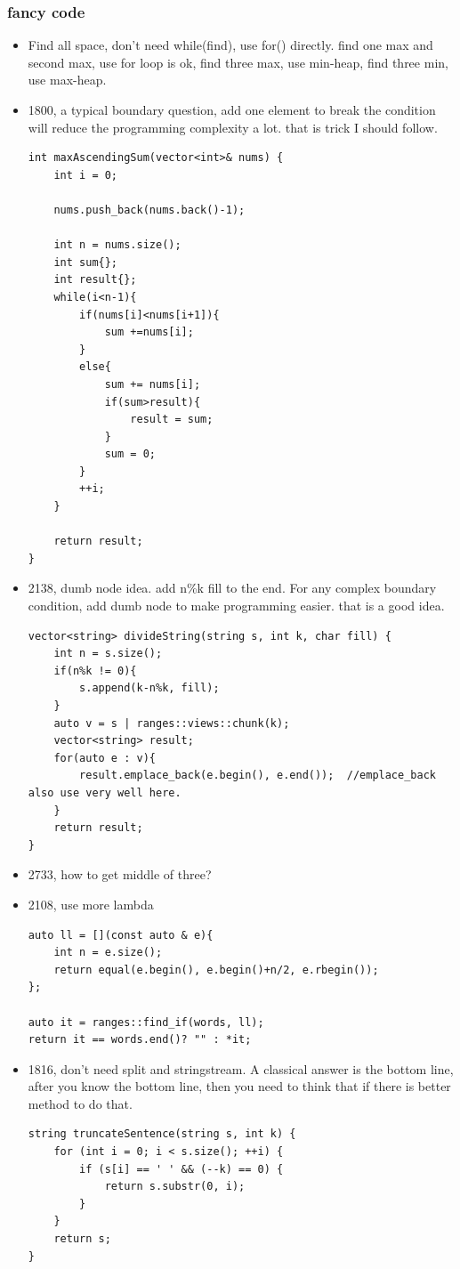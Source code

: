 \documentclass[a4paper,11pt,twoside]{book}
\begin{document}
\subsubsection{fancy code}
\begin{itemize}
	
	\item Find all space, don't need while(find), use for() directly. find one max and second max, use for loop is ok, find three max, use min-heap, find three min, use max-heap. 
	
	\item 1800, a typical boundary question, add one element to break the condition will reduce the programming complexity a lot. that is trick I should follow. 
	
\begin{lstlisting}
int maxAscendingSum(vector<int>& nums) {
	int i = 0;
	
	nums.push_back(nums.back()-1);
	
	int n = nums.size();
	int sum{};
	int result{};
	while(i<n-1){
		if(nums[i]<nums[i+1]){
			sum +=nums[i];
		}
		else{
			sum += nums[i];
			if(sum>result){
				result = sum;
			}
			sum = 0;
		}
		++i;
	}
	
	return result;
}	 
\end{lstlisting}

	\item 2138, dumb node idea. add n\%k fill to the end. For any complex boundary condition, add dumb node to make programming easier. that is a good idea. 
	
\begin{lstlisting}
vector<string> divideString(string s, int k, char fill) {
	int n = s.size();
	if(n%k != 0){
		s.append(k-n%k, fill);
	}
	auto v = s | ranges::views::chunk(k);
	vector<string> result;
	for(auto e : v){
		result.emplace_back(e.begin(), e.end());  //emplace_back also use very well here. 
	}
	return result;
}
\end{lstlisting}
	
	
	\item 2733, how to get middle of three? 
	
	
	\item 2108, use more lambda
\begin{lstlisting}
auto ll = [](const auto & e){
	int n = e.size();
	return equal(e.begin(), e.begin()+n/2, e.rbegin());
};

auto it = ranges::find_if(words, ll);
return it == words.end()? "" : *it;	
\end{lstlisting}

	\item 1816, don't need split and stringstream. A classical answer is the bottom line, after you know the bottom line, then you need to think that if there is better method to do that. 
\begin{lstlisting}
string truncateSentence(string s, int k) {
	for (int i = 0; i < s.size(); ++i) {
		if (s[i] == ' ' && (--k) == 0) {
			return s.substr(0, i);
		}
	}
	return s;
}
\end{lstlisting}

\end{itemize}
\end{document}
